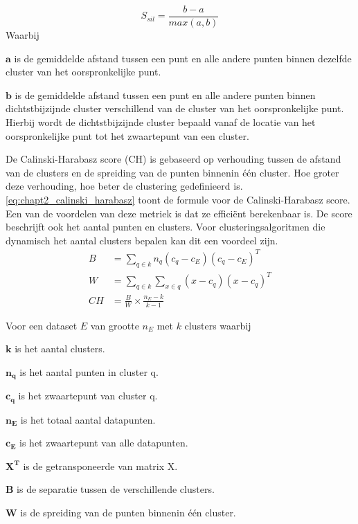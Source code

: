 \begin{equation}
    S_{sil} = \frac{b - a}{max(a,b)}
    \label{eq:chapt2_silhoutte_coeff}
\end{equation}
Waarbij
\begin{description}
    \item$\mathbf{a}$ is de gemiddelde afstand tussen een punt en alle andere punten binnen dezelfde cluster van het oorspronkelijke punt.
    \item$\mathbf{b}$ is de gemiddelde afstand tussen een punt en alle andere punten binnen dichtstbijzijnde cluster verschillend van de cluster van het oorspronkelijke punt. Hierbij wordt de dichtstbijzijnde cluster bepaald vanaf de locatie van het oorspronkelijke punt tot het zwaartepunt van een cluster.
\end{description}

De Calinski-Harabasz score (CH) is gebaseerd op verhouding tussen de afstand van de clusters en de spreiding van de punten binnenin één cluster. Hoe groter deze verhouding, hoe beter de clustering gedefinieerd is. \autoref{eq:chapt2_calinski_harabasz} toont de formule voor de Calinski-Harabasz score. \cite{calinski_paper} Een van de voordelen van deze metriek is dat ze efficiënt berekenbaar is. De score beschrijft ook het aantal punten en clusters. Voor clusteringsalgoritmen die dynamisch het aantal clusters bepalen kan dit een voordeel zijn.
\begin{equation}
    \begin{split}
        B & = \sum_{q \in k} n_q(c_q - c_E)(c_q-c_E)^{T} \\
        W & = \sum_{q \in k} \sum_{x \in q} (x-c_q)(x-c_q)^{T} \\
        CH & = \frac{B}{W} \times \frac{n_E-k}{k-1}
    \end{split}
    \label{eq:chapt2_calinski_harabasz}
\end{equation}

Voor een dataset $E$ van grootte $n_E$ met $k$ clusters waarbij
\begin{description}
    \item$\mathbf{k}$ is het aantal clusters.
    \item$\mathbf{n_q}$ is het aantal punten in cluster q.
    \item$\mathbf{c_q}$ is het zwaartepunt van cluster q.
    \item$\mathbf{n_E}$ is het totaal aantal datapunten.
    \item$\mathbf{c_E}$ is het zwaartepunt van alle datapunten.
    \item$\mathbf{X^T}$ is de getransponeerde van matrix X. 
    \item$\mathbf{B}$ is de separatie tussen de verschillende clusters.
    \item$\mathbf{W}$ is de spreiding van de punten binnenin één cluster.
\end{description}

